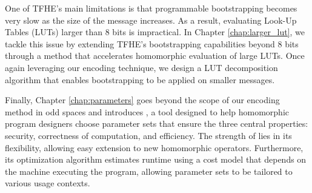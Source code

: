 One of \gls{TFHE}’s main limitations is that programmable bootstrapping becomes very slow as the size of the message increases. As a result, evaluating Look-Up Tables (LUTs) larger than 8 bits is impractical. In Chapter \ref{chap:larger_lut}, we tackle this issue by extending \gls{TFHE}’s bootstrapping capabilities beyond 8 bits through a method that accelerates homomorphic evaluation of large LUTs. Once again leveraging our encoding technique, we design a \gls{LUT} decomposition algorithm that enables bootstrapping to be applied on smaller messages.


Finally, Chapter \ref{chap:parameters} goes beyond the scope of our encoding method in odd spaces and introduces \toolName, a tool designed to help homomorphic program designers choose parameter sets that ensure the three central properties: security, correctness of computation, and efficiency. The strength of \toolName lies in its flexibility, allowing easy extension to new homomorphic operators. Furthermore, its optimization algorithm estimates runtime using a cost model that depends on the machine executing the program, allowing parameter sets to be tailored to various usage contexts.
